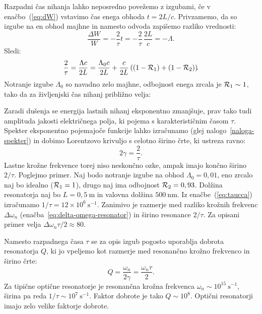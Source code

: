 Razpadni čas nihanja lahko neposredno povežemo z izgubami, če v enačbo~(\ref{eq:dW})
vstavimo čas enega obhoda $t=2L/c$. Privzamemo, da so izgube na en obhod majhne in namesto 
odvoda zapišemo razliko vrednosti:
\begin{equation}
\frac{\Delta W}{W}= -\frac{2}{\tau} t = -\frac{2}{\tau}\, \frac{2L}{c} = -\Lambda.
\end{equation}
Sledi:
\begin{equation}
\frac{2}{\tau}=\frac{\Lambda c}{2L}=\frac{\Lambda_0c}{2L}+\frac{c}{2L}\left((1-{\cal R}_{1})
+(1-{\cal R}_{2})\right)\!\!.
\label{taulambda}
\end{equation}
Notranje izgube $\Lambda_0$ so navadno zelo majhne, 
odbojnost enega zrcala je ${\cal R}_{1} \sim 1$, tako da za življenjski čas 
nihanj približno velja:

Zaradi dušenja se energija lastnih nihanj eksponentno zmanjšuje, prav tako tudi
amplituda jakosti električnega polja, ki pojema s karakterističnim časom $\tau$. 
Spekter eksponentno pojemajoče funkcije lahko izračunamo
(glej nalogo~\ref{naloga-spekter}) in dobimo Lorentzovo krivuljo 
s celotno širino črte, ki ustreza ravno:
\begin{equation}
2\gamma=\frac{2}{\tau}.
\label{3.26}
\end{equation}
Lastne krožne frekvence torej niso neskončno ozke, ampak imajo končno širino $2/\tau$.
Poglejmo primer. Naj bodo notranje izgube na obhod $\Lambda_0=0,01$,
eno zrcalo naj bo idealno (${\cal R}_1=1$), drugo naj ima odbojnost ${\cal R}_2=0,93$. Dolžina
resonatorja naj bo $L=0,5~\si{\metre}$ in valovna dolžina $500~\si{\nano\metre}$. Iz enačbe~(\ref{eq:taucca}) izračunamo $1/\tau=12\times10^{6}~\si{\second}^{-1}$. 
Zanimivo je razmerje med 
razliko krožnih frekvenc $\Delta \omega_n$ 
(enačba~\ref{eq:delta-omega-resonator}) in širino resonance $2/\tau$. 
Za opisani primer velja $\Delta\omega_n\tau/2 \approx 80$.

\begin{remark}
Namesto razpadnega časa $\tau$ se za opis izgub pogosto uporablja
dobrota resonatorja $Q$, ki jo vpeljemo kot
razmerje med resonančno krožno frekvenco in širino črte:
\begin{equation}
\label{eq:qdef}
Q=\frac{\omega_{n}}{2\gamma} = \frac{\omega_{n}\tau}{2}.
\end{equation}
Za tipične optične resonatorje je resonančna krožna
frekvenca $\omega_n \sim 10^{15}~\si{\second}^{-1}$, širina pa reda 
 $1/\tau \sim 10^{7}~\si{\second}^{-1}$. Faktor dobrote je tako $Q \sim 10^{8}$. Optični 
 resonatorji imajo zelo velike faktorje dobrote.
\end{remark}

